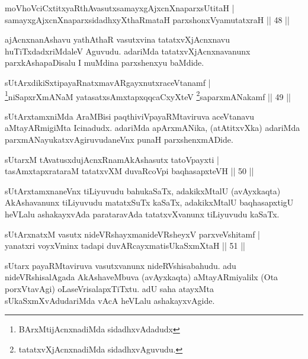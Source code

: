 \begin{shl}
moVhoVciCxtitxyaRthAvasutxsamayxgAjxcnXnaparxsUtitaH |\\
samayxgAjxcnXnaparxsidadhxyXthaRmataH parxshonxV\s yamutatxraH \hfill || 48 ||
\end{shl}

\begin{artha}
ajAcnxnanAshavu yathAthaR vasutxvina tatatxvXjAcnxnavu huTiTxdadxriMdaleV Aguvudu. adariMda tatatxvXjAcnxnavanunx parxkAshapaDisalu I muMdina parxshenxyu baMdide.
\end{artha}

\begin{shl}
sUtArxdikiSxtipayaRnatxmavARgayxnutxraceVtanamf |\\
\footnote{BArxMtijAcnxnadiMda sidadhxvAdadudx}niSapxrXmANaM yatasatxsAmxtapxqqcaCxyXteV \footnote{tatatxvXjAcnxnadiMda sidadhxvAguvudu.}saparxmANakamf \hfill || 49 ||
\end{shl}

\begin{artha}
sUtArxtamxniMda AraMBisi paqthiviVpayaRMtaviruva aceVtanavu aMtayARmigiMta Icinadudx. adariMda apArxmANika, (atAtitxvXka) adariMda parxmANayukatxvAgiruvudaneVnx punaH parxshenxmADide.
\end{artha}


\begin{shl}
sUtarxM tAvatusxdujAcnxRnamAkAshasutx tatoV\s payxti |\\
tasAmxtapxrataraM tatatxvXM duvaRcoV\s pi baqhasapxteVH \hfill || 50 ||
\end{shl}

\begin{artha}
sUtArxtamxnaneVnx tiLiyuvudu bahukaSaTx, adakikxMtalU (avAyxkaqta) AkAshavanunx tiLiyuvudu matatxSuTx kaSaTx, adakikxMtalU baqhasapxtigU heVLalu ashakayxvAda parataravAda tatatxvXvanunx tiLiyuvudu kaSaTx.
\end{artha}


\begin{shl}
sUtArxnatxM vasutx nideVRshayxmanideVRsheyxV parxveVshitamf |\\
yanatxri voyxVminx tadapi duvARcayxmatisUkaSxmXtaH \hfill || 51 ||
\end{shl}

\begin{artha}
sUtarx payaRMtaviruva vasutxvanunx nideRVshisabahudu. adu nideVRshisalAgada AkAshaveMbuva (avAyxkaqta) aMtayARmiyalilx (Ota porxVtavAgi) oLaseVrisalapxTiTxtu. adU saha atayxMta sUkaSxmXvAdudariMda vAcA heVLalu ashakayxvAgide.
\end{artha}

